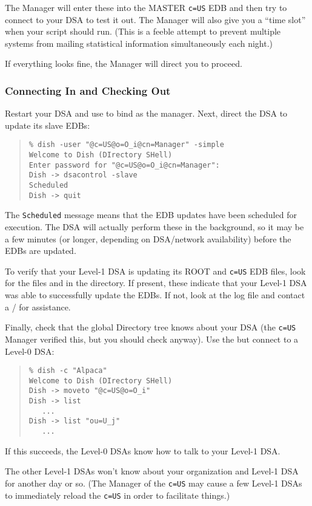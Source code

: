 The Manager will enter these into the MASTER \verb"c=US" EDB and then
try to connect to your DSA to test it out.
The Manager will also give you a ``time slot'' when your 
script should run.
(This is a feeble attempt to prevent multiple systems from
mailing statistical information simultaneously each night.)

If everything looks fine,
the Manager will direct you to proceed.

\subsubsection	{Connecting In and Checking Out}
Restart your DSA and use  to bind as the manager.
Next,
direct the DSA to update its slave EDBs:
\begin{quote}\small\begin{verbatim}
% dish -user "@c=US@o=O_i@cn=Manager" -simple
Welcome to Dish (DIrectory SHell)
Enter password for "@c=US@o=O_i@cn=Manager": 
Dish -> dsacontrol -slave
Scheduled
Dish -> quit
\end{verbatim}\end{quote}
The \verb"Scheduled" message means that the EDB updates have been scheduled
for execution.
The DSA will actually perform these in the background,
so it may be a few minutes (or longer, depending on DSA/network availability)
before the EDBs are updated.

To verify that your Level-1 DSA is updating its ROOT and \verb"c=US" EDB
files,
look for the files  and 
in the  directory.
If present,
these indicate that your Level-1 DSA was able to successfully update the EDBs.
If not,
look at the  log file and contact a \camayoc/ for
assistance.

Finally,
check that the global Directory tree knows about your DSA
(the \verb"c=US" Manager verified this, but you should check anyway).
Use the  but connect to a Level-0 DSA:
\begin{quote}\small\begin{verbatim}
% dish -c "Alpaca"
Welcome to Dish (DIrectory SHell)
Dish -> moveto "@c=US@o=O_i"
Dish -> list
   ...
Dish -> list "ou=U_j"
   ...
\end{verbatim}\end{quote}
If this succeeds, the Level-0 DSAs know how to talk to your Level-1 DSA.

The other Level-1 DSAs won't know about your organization and Level-1 DSA
for another day or so.
(The Manager of the \verb"c=US" may cause a few Level-1 DSAs to immediately
reload the \verb"c=US" in order to facilitate things.)

